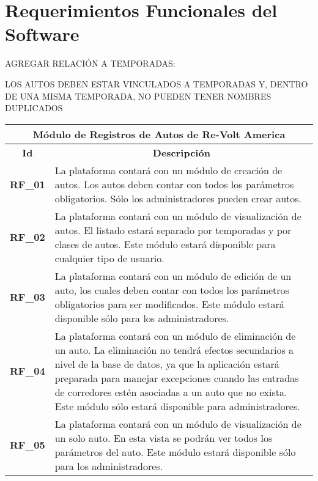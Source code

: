 \section{Requerimientos Funcionales del Software}

AGREGAR RELACIÓN A TEMPORADAS: 

LOS AUTOS DEBEN ESTAR VINCULADOS A TEMPORADAS Y, DENTRO DE UNA MISMA TEMPORADA, NO PUEDEN TENER NOMBRES DUPLICADOS

\begin{center}
	\begin{tabular}{ | l | p{15cm} |}
		\hline
		\multicolumn{2}{|c|}{\textbf{Módulo de Registros de Autos de Re-Volt America}} \\
		\hline
		\multicolumn{1}{|c|}{\textbf{Id}} & \multicolumn{1}{|c|}{\textbf{Descripción}} \\
		\hline
		{\textbf{RF\_01}} & La plataforma contará con un módulo de creación de autos. Los autos deben contar con todos los parámetros obligatorios. Sólo los administradores pueden crear autos. \\ \hline

		{\textbf{RF\_02}} & La plataforma contará con un módulo de visualización de autos. El listado estará separado por temporadas y por clases de autos. Este módulo estará disponible para cualquier tipo de usuario. \\ \hline

		{\textbf{RF\_03}} & La plataforma contará con un módulo de edición de un auto, los cuales deben contar con todos los parámetros obligatorios para ser modificados. Este módulo estará disponible sólo para los administradores. \\ \hline
		
		{\textbf{RF\_04}} & La plataforma contará con un módulo de eliminación de un auto. La eliminación no tendrá efectos secundarios a nivel de la base de datos, ya que la aplicación estará preparada para manejar excepciones cuando las entradas de corredores estén asociadas a un auto que no exista. Este módulo sólo estará disponible para administradores. \\ \hline
		
		{\textbf{RF\_05}} & La plataforma contará con un módulo de visualización de un solo auto. En esta vista se podrán ver todos los parámetros del auto. Este módulo estará disponible sólo para los administradores. \\ \hline
	\end{tabular}
\end{center}

